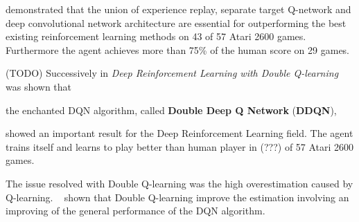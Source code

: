 \citeauthor{Mnih2015}  demonstrated that the union of experience replay, separate target Q-network and deep convolutional network architecture are essential for outperforming the best existing reinforcement learning methods on 43 of 57 Atari 2600 games. Furthermore the agent achieves more than 75\% of the human score on 29 games.


(TODO)
Successively in \textit{Deep Reinforcement Learning with Double Q-learning}~\cite{Hasselt:2016:DRL:3016100.3016191} was shown that 

the enchanted DQN algorithm, called \textbf{Double Deep Q Network} (\textbf{DDQN}),

showed an important result for the Deep Reinforcement Learning field. The agent trains itself and learns to play better than human player in (???) of 57 Atari 2600 games.

The issue resolved with Double Q-learning was the high overestimation caused by Q-learning. \citeauthor{Hasselt:2016:DRL:3016100.3016191}~ shown that Double Q-learning improve the estimation involving an improving of the general performance of the DQN algorithm.


